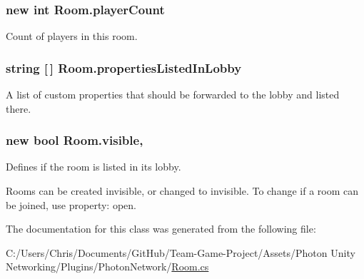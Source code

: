 \subsubsection[{\texorpdfstring{player\+Count}{playerCount}}]{\setlength{\rightskip}{0pt plus 5cm}new int Room.\+player\+Count\hspace{0.3cm}{\ttfamily [get]}}\hypertarget{class_room_aa9d85e54b2ff1b151de3670e87549966}{}\label{class_room_aa9d85e54b2ff1b151de3670e87549966}


Count of players in this room.

\subsubsection[{\texorpdfstring{properties\+Listed\+In\+Lobby}{propertiesListedInLobby}}]{\setlength{\rightskip}{0pt plus 5cm}string \mbox{[}$\,$\mbox{]} Room.\+properties\+Listed\+In\+Lobby\hspace{0.3cm}{\ttfamily [get]}}\hypertarget{class_room_a9f4957e84aefcd801a35a63f44ce42f3}{}\label{class_room_a9f4957e84aefcd801a35a63f44ce42f3}


A list of custom properties that should be forwarded to the lobby and listed there. 

\subsubsection[{\texorpdfstring{visible}{visible}}]{\setlength{\rightskip}{0pt plus 5cm}new bool Room.\+visible\hspace{0.3cm}{\ttfamily [get]}, {\ttfamily [set]}}\hypertarget{class_room_a8792cdddd5a4b8933bea7adab8438edf}{}\label{class_room_a8792cdddd5a4b8933bea7adab8438edf}


Defines if the room is listed in its lobby. 

Rooms can be created invisible, or changed to invisible. To change if a room can be joined, use property\+: open. 

The documentation for this class was generated from the following file\+:\begin{DoxyCompactItemize}
\item 
C\+:/\+Users/\+Chris/\+Documents/\+Git\+Hub/\+Team-\/\+Game-\/\+Project/\+Assets/\+Photon Unity Networking/\+Plugins/\+Photon\+Network/\hyperlink{_room_8cs}{Room.\+cs}\end{DoxyCompactItemize}
